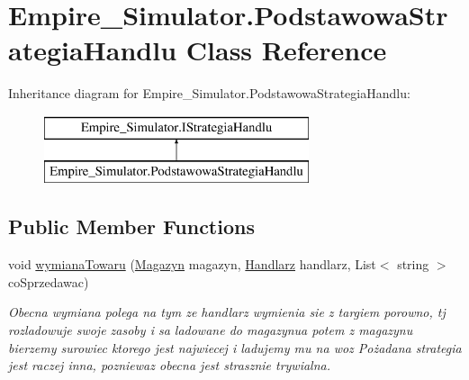 \hypertarget{class_empire___simulator_1_1_podstawowa_strategia_handlu}{\section{Empire\+\_\+\+Simulator.\+Podstawowa\+Strategia\+Handlu Class Reference}
\label{class_empire___simulator_1_1_podstawowa_strategia_handlu}
}
Inheritance diagram for Empire\+\_\+\+Simulator.\+Podstawowa\+Strategia\+Handlu\+:\begin{figure}[H]
\begin{center}
\leavevmode
\includegraphics[height=2.000000cm]{class_empire___simulator_1_1_podstawowa_strategia_handlu}
\end{center}
\end{figure}
\subsection*{Public Member Functions}
\begin{DoxyCompactItemize}
\item 
void \hyperlink{class_empire___simulator_1_1_podstawowa_strategia_handlu_ae653aa636d479f2da21fa575320c56e9}{wymiana\+Towaru} (\hyperlink{class_empire___simulator_1_1_magazyn}{Magazyn} magazyn, \hyperlink{class_empire___simulator_1_1_handlarz}{Handlarz} handlarz, List$<$ string $>$ co\+Sprzedawac)
\begin{DoxyCompactList}\small\item\em Obecna wymiana polega na tym ze handlarz wymienia sie z targiem porowno, tj rozladowuje swoje zasoby i sa ladowane do magazynua potem z magazynu bierzemy surowiec ktorego jest najwiecej i ladujemy mu na woz Pożadana strategia jest raczej inna, pozniewaz obecna jest strasznie trywialna. \end{DoxyCompactList}\end{DoxyCompactItemize}


